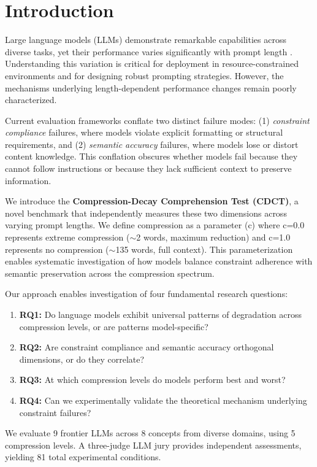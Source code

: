 \documentclass[11pt]{article}
\begin{document}
\section{Introduction}

Large language models (LLMs) demonstrate remarkable capabilities across diverse tasks, yet their performance varies significantly with prompt length \citep{jiang2023longllmlingua}. Understanding this variation is critical for deployment in resource-constrained environments and for designing robust prompting strategies. However, the mechanisms underlying length-dependent performance changes remain poorly characterized.

Current evaluation frameworks conflate two distinct failure modes: (1) \textit{constraint compliance} failures, where models violate explicit formatting or structural requirements, and (2) \textit{semantic accuracy} failures, where models lose or distort content knowledge. This conflation obscures whether models fail because they cannot follow instructions or because they lack sufficient context to preserve information.

We introduce the \textbf{Compression-Decay Comprehension Test (CDCT)}, a novel benchmark that independently measures these two dimensions across varying prompt lengths. We define compression as a parameter (c) where c=0.0 represents extreme compression ($\sim$2 words, maximum reduction) and c=1.0 represents no compression ($\sim$135 words, full context). This parameterization enables systematic investigation of how models balance constraint adherence with semantic preservation across the compression spectrum.

Our approach enables investigation of four fundamental research questions:

\begin{enumerate}
\item \textbf{RQ1:} Do language models exhibit universal patterns of degradation across compression levels, or are patterns model-specific?
\item \textbf{RQ2:} Are constraint compliance and semantic accuracy orthogonal dimensions, or do they correlate?
\item \textbf{RQ3:} At which compression levels do models perform best and worst?
\item \textbf{RQ4:} Can we experimentally validate the theoretical mechanism underlying constraint failures?
\end{enumerate}

We evaluate 9 frontier LLMs across 8 concepts from diverse domains, using 5 compression levels. A three-judge LLM jury provides independent assessments, yielding 81 total experimental conditions.
\end{document}
